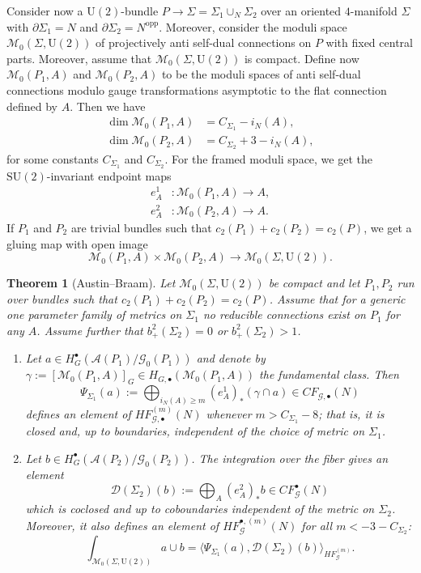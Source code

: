 \documentclass[11pt,colorinlistoftodos]{amsart}
\numberwithin{equation}{subsection}
\theoremstyle{plain}
\newtheorem{thm}{Theorem}[subsection]
\theoremstyle{definition}
\theoremstyle{remark}
\newcommand{\calD}{\mathcal{D}}
\newcommand{\de}{\partial}
\newcommand{\calA}{\mathcal{A}}
\newcommand{\calG}{\mathcal{G}}
\newcommand{\calM}{\mathcal{M}}
\begin{document}
Consider now a $\mathrm{U}(2)$-bundle $P\to \Sigma=\Sigma_1\cup_N\Sigma_2$ over an oriented $4$-manifold $\Sigma$ with $\de\Sigma_1=N$ and $\de\Sigma_2=N^\mathrm{opp}$. Moreover, consider the moduli space $\calM_0(\Sigma,\mathrm{U}(2))$ of projectively anti self-dual connections on $P$ with fixed central parts. Moreover, assume that $\calM_0(\Sigma,\mathrm{U}(2))$ is compact. Define now $\calM_0(P_1,A)$ and $\calM_0(P_2,A)$ to be the moduli spaces of anti self-dual connections modulo gauge transformations asymptotic to the flat connection defined by $A$. Then we have \begin{align}
    \dim \calM_0(P_1,A)&=C_{\Sigma_1}-i_N(A),\\
    \dim \calM_0(P_2,A)&=C_{\Sigma_2}+3-i_N(A),
\end{align}
for some constants $C_{\Sigma_1}$ and $C_{\Sigma_2}$. For the framed moduli space, we get the $\mathrm{SU}(2)$-invariant endpoint maps
\begin{align*}
    e_A^1&\colon \calM_0(P_1,A)\to A,\\
    e_A^2&\colon \calM_0(P_2,A)\to A.
\end{align*}
If $P_1$ and $P_2$ are trivial bundles such that $c_2(P_1)+c_2(P_2)=c_2(P)$, we get a gluing map with open image
\[
\calM_0(P_1,A)\times \calM_0(P_2,A)\to \calM_0(\Sigma,\mathrm{U}(2)).
\]

\begin{thm}[Austin--Braam\cite{AustinBraam1996}]
Let $\calM_0(\Sigma,\mathrm{U}(2))$ be compact and let $P_1,P_2$ run over bundles such that $c_2(P_1)+c_2(P_2)=c_2(P)$. Assume that for a generic one parameter family of metrics on $\Sigma_1$ no reducible connections exist on $P_1$ for any $A$. Assume further that $b_+^2(\Sigma_2)=0$ or $b^2_+(\Sigma_2)>1$.
\begin{enumerate}
    \item Let $a\in H^\bullet_G(\calA(P_1)/\calG_0(P_1))$ and denote by $\gamma:=\left[\calM_0(P_1,A)\right]_G\in H_{G,\bullet}(\calM_0(P_1,A))$ the fundamental class. Then 
    \[
    \Psi_{\Sigma_1}(a):=\bigoplus_{i_N(A)\geq m}(e_A^1)_*(\gamma\cap a)\in CF_{\calG,\bullet}(N)
    \]
    defines an element of $HF^{(m)}_{\calG,\bullet}(N)$ whenever $m>C_{\Sigma_1}-8$; that is, it is closed and, up to boundaries, independent of the choice of metric on $\Sigma_1$.
    \item Let $b\in H^\bullet_G(\calA(P_2)/\calG_0(P_2))$. The integration over the fiber gives an element 
    \[
    \calD(\Sigma_2)(b):=\bigoplus_{A}(e^2_A)_*b\in CF^\bullet_\calG(N)
    \]
    which is coclosed and up to coboundaries independent of the metric on $\Sigma_2$. Moreover, it also defines an element of $HF^{\bullet,(m)}_\calG(N)$ for all $m<-3-C_{\Sigma_2}$:
    \[
    \int_{\calM_0(\Sigma,\mathrm{U}(2))}a\cup b=\langle \Psi_{\Sigma_1}(a),\calD(\Sigma_2)(b)\rangle_{HF_{\calG}^{(m)}}.
    \]
\end{enumerate}
\end{thm} 
\end{document}
